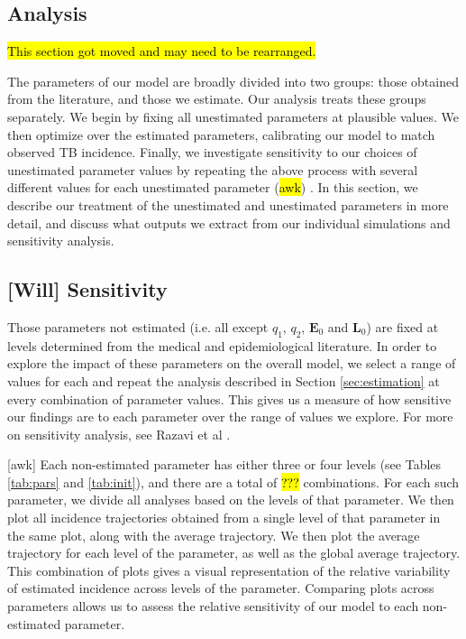 \documentclass[sn-mathphys,Numbered]{sn-jnl}%
\newcommand{\cE}{\mathbf{E}}
\newcommand{\cL}{\mathbf{L}}
\theoremstyle{thmstyleone}%
\theoremstyle{thmstyletwo}%
\theoremstyle{thmstylethree}%
\begin{document}
\subsection{Analysis}

\hl{This section got moved and may need to be rearranged.}


The parameters of our model are broadly divided into two groups: those obtained from the literature, and those we estimate. Our analysis treats these groups separately. We begin by fixing all unestimated parameters at plausible values. We then optimize over the estimated parameters, calibrating our model to match observed TB incidence. Finally, we investigate sensitivity to our choices of unestimated parameter values by repeating the above process with several different values for each unestimated parameter (\hl{awk}) \cite{Razavi2021TheSupport}. In this section, we describe our treatment of the unestimated and unestimated parameters in more detail, and discuss what outputs we extract from our individual simulations and sensitivity analysis.

\subsection{[Will] Sensitivity}

Those parameters not estimated (i.e. all except $q_1$, $q_2$, $\cE_0$ and $\cL_0$) are fixed at levels determined from the medical and epidemiological literature. In order to explore the impact of these parameters on the overall model, we select a range of values for each and repeat the analysis described in Section \ref{sec:estimation} at every combination of parameter values. This gives us a measure of how sensitive our findings are to each parameter over the range of values we explore. For more on sensitivity analysis, see Razavi et al \cite{Razavi2021TheSupport}. 

[awk] Each non-estimated parameter has either three or four levels (see Tables \ref{tab:pars} and \ref{tab:init}), and there are a total of \hl{???} combinations. For each such parameter, we divide all analyses based on the levels of that parameter. We then plot all incidence trajectories obtained from a single level of that parameter in the same plot, along with the average trajectory. We then plot the average trajectory for each level of the parameter, as well as the global average trajectory. This combination of plots gives a visual representation of the relative variability of estimated incidence across levels of the parameter. Comparing plots across parameters allows us to assess the relative sensitivity of our model to each non-estimated parameter.
\end{document}
